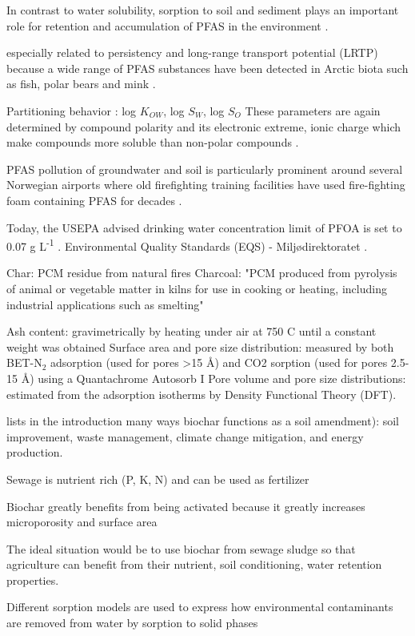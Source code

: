  In contrast to water solubility, sorption to soil and sediment plays an important role for retention and accumulation of PFAS in the environment \citep{li2018,LehmannAndJoseph2015,Cornelissen2005}.
 
   \citep{MD2016workshop} \citep{MD2020EQS}
especially related to persistency and long-range transport potential (LRTP) \citep{MD2020EQS} because a wide range of PFAS substances have been detected in Arctic biota such as fish, polar bears and mink \citep{Schlabach2017}.

Partitioning behavior \citep{wang2011physchem}: log $K_{OW}$, log $S_W$, log $S_O$ These parameters are again determined by compound polarity and its electronic extreme, ionic charge which make compounds more soluble than non-polar compounds \citep{Reemtsma2016}.

PFAS pollution of groundwater and soil is particularly prominent around several Norwegian airports where old firefighting training facilities have used fire-fighting foam containing PFAS for decades .

Today, the USEPA advised drinking water concentration limit of PFOA is set to 0.07 \textmu g L\textsuperscript{-1} \citep{us2016drinking}. Environmental Quality Standards (EQS) - Miljødirektoratet \citep{EC2020PFAS}.

Char: PCM residue from natural fires
Charcoal: "PCM produced from pyrolysis of animal or vegetable matter in kilns for use in cooking or heating, including industrial applications such as smelting"

Ash content: gravimetrically by heating under air at 750 \textdegree C until a constant weight was obtained
Surface area and pore size distribution: measured by both BET-N$_2$ adsorption (used for pores >15 Å) and CO2 sorption (used for pores 2.5-15 Å) using a Quantachrome Autosorb I
Pore volume and pore size distributions: estimated from the adsorption isotherms by Density Functional Theory (DFT).

lists in the introduction many ways biochar functions as a soil amendment): soil improvement, waste management, climate change mitigation, and energy production.
 
Sewage is nutrient rich (P, K, N) and can be used as fertilizer
 
Biochar greatly benefits from being activated because it greatly increases microporosity and surface area
  
The ideal situation would be to use biochar from sewage sludge so that agriculture can benefit from their nutrient, soil conditioning, water retention properties.

Different sorption models are used to express how environmental contaminants are removed from water by sorption to solid phases
